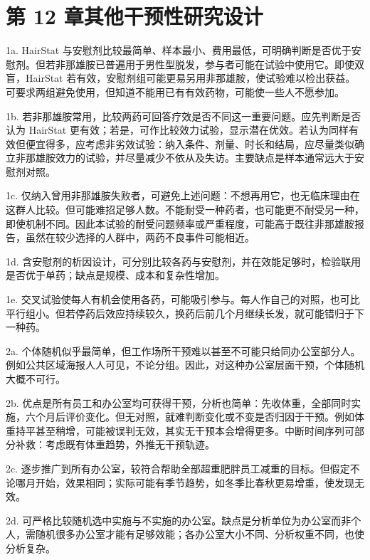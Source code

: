 \section{第 12 章\quad 其他干预性研究设计}
\begin{answerlist}
\item[1a.] HairStat 与安慰剂比较最简单、样本最小、费用最低，可明确判断是否优于安慰剂。但若非那雄胺已普遍用于男性型脱发，参与者可能在试验中使用它。即使双盲，HairStat 若有效，安慰剂组可能更易另用非那雄胺，使试验难以检出获益。可要求两组避免使用，但知道不能用已有有效药物，可能使一些人不愿参加。
\item[1b.] 若非那雄胺常用，比较两药可回答疗效是否不同这一重要问题。应先判断是否认为 HairStat 更有效；若是，可作比较效力试验，显示潜在优效。若认为同样有效但便宜得多，应考虑非劣效试验：纳入条件、剂量、时长和结局，应尽量类似确立非那雄胺效力的试验，并尽量减少不依从及失访。主要缺点是样本通常远大于安慰剂对照。
\item[1c.] 仅纳入曾用非那雄胺失败者，可避免上述问题：不想再用它，也无临床理由在这群人比较。但可能难招足够人数。不能耐受一种药者，也可能更不耐受另一种，即使机制不同。因此本试验的耐受问题频率或严重程度，可能高于既往非那雄胺报告，虽然在较少选择的人群中，两药不良事件可能相近。
\item[1d.] 含安慰剂的析因设计，可分别比较各药与安慰剂，并在效能足够时，检验联用是否优于单药；缺点是规模、成本和复杂性增加。
\item[1e.] 交叉试验使每人有机会使用各药，可能吸引参与。每人作自己的对照，也可比平行组小。但若停药后效应持续较久，换药后前几个月继续长发，就可能错归于下一种药。
\item[2a.] 个体随机似乎最简单，但工作场所干预难以甚至不可能只给同办公室部分人。例如公共区域海报人人可见，不论分组。因此，对这种办公室层面干预，个体随机大概不可行。
\item[2b.] 优点是所有员工和办公室均可获得干预，分析也简单：先收体重，全部同时实施，六个月后评价变化。但无对照，就难判断变化或不变是否归因于干预。例如体重持平甚至稍增，可能被误判无效，其实无干预本会增得更多。中断时间序列可部分补救：考虑既有体重趋势，外推无干预轨迹。
\item[2c.] 逐步推广到所有办公室，较符合帮助全部超重肥胖员工减重的目标。但假定不论哪月开始，效果相同；实际可能有季节趋势，如冬季比春秋更易增重，使发现无效。
\item[2d.] 可严格比较随机选中实施与不实施的办公室。缺点是分析单位为办公室而非个人，需随机很多办公室才能有足够效能；各办公室大小不同、分析权重不同，也使分析复杂。
\end{answerlist}

